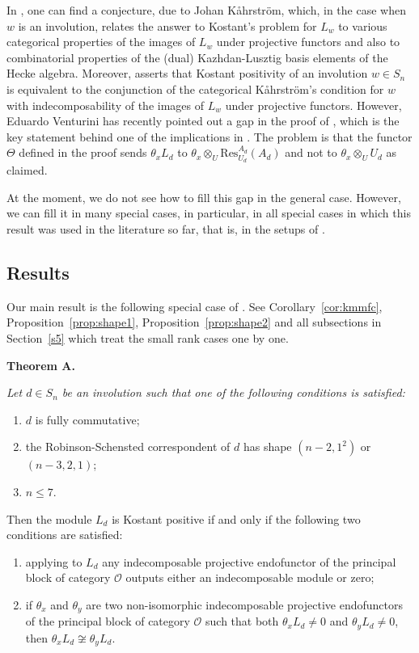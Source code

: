\documentclass[a4paper]{amsart}
\begin{document}
In \cite{KMM}, one can find a conjecture, due to Johan K{\aa}hrstr{\"o}m,
which, in the case when $w$ is an involution, relates the answer to 
Kostant's problem for $L_w$ to various categorical properties of 
the images of $L_w$ under projective functors and also to  combinatorial 
properties of the (dual) Kazhdan-Lusztig basis elements of the Hecke algebra.
Moreover, \cite[Theorem~8.16]{KMM} asserts that Kostant positivity of 
an involution $w\in S_n$ is equivalent to the conjunction of the 
categorical K{\aa}hrstr{\"o}m's condition for $w$ with indecomposability 
of the images of $L_w$ under projective functors. However, 
Eduardo Venturini has recently pointed out a gap in the proof of 
\cite[Proposition~8.15]{KMM}, which is the key statement behind 
one of the implications in \cite[Theorem~8.16]{KMM}.
The problem is that the functor $\Theta$ defined in the proof 
sends $\theta_xL_d$ to $\theta_x \otimes_U \mathrm{Res}^{A_d}_{U_d}(A_d)$
and not to $\theta_x \otimes_U U_d$ as claimed.


At the moment, we do not see how to fill this gap in the general case.
However, we can fill it in many special cases, in particular, in all
special cases in which this result was used in the literature so far,
that is, in the setups of \cite{KMM,MMM,CM2,CM4}.

\subsection{Results}\label{s1.2}

Our main result is the following special case of \cite[Theorem~8.16]{KMM}. 
See Corollary~\ref{cor:kmmfc}, Proposition~\ref{prop:shape1},
Proposition~\ref{prop:shape2} and all subsections in Section~\ref{s5}
which treat the small rank cases one by one.

{\bf Theorem A.}
{\em
Let $d\in S_n$ be an involution such that one of the following
conditions is satisfied:

\begin{enumerate}[$($a$)$]
\item\label{ca} $d$ is fully commutative;
\item\label{cc} the Robinson-Schensted correspondent of $d$
has shape $(n-2,1^2)$ or $(n-3,2,1)$;
\item\label{cb} $n\leq 7$.
\end{enumerate}
Then the module $L_d$ is Kostant positive if and only if the 
following two conditions are satisfied:
\begin{enumerate}[$($i$)$]
\item\label{ci} applying to $L_d$ any indecomposable projective 
endofunctor of the principal block of category $\mathcal{O}$
outputs either an indecomposable module or zero;
\item\label{cii} if $\theta_x$ and $\theta_y$ are two non-isomorphic 
indecomposable projective 
endofunctors of the principal block of category $\mathcal{O}$
such that both $\theta_x L_d\neq 0$ and $\theta_y L_d\neq 0$,
then $\theta_x L_d\not\cong \theta_y L_d$.
\end{enumerate}
}
\end{document}
